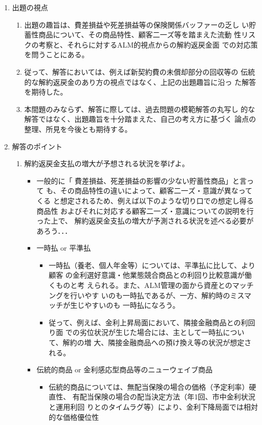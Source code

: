 \documentclass[report,gutter=10mm,fore-edge=10mm,uplatex,dvipdfmx]{jlreq}
\begin{document}
\begin{enumerate}
 \item 出題の視点
\begin{enumerate}
 \item 出題の趣旨は、費差損益や死差損益等の保険関係バッファーの乏し
い貯蓄性商品について、その商品特性、顧客二一ズ等を踏まえた流動
性リスクの考察と、それらに対するALM的視点からの解約返戻金面
での対応策を問うことにある。
 \item 従って、解答においては、例えば新契約費の未償却部分の回収等の
伝統的な解約返戻金のあり方の視点ではなく、上記の出題趣旨に沿っ
た解答を期待した。
 \item 本間題のみならず、解答に際しては、過去問題の模範解答の丸写し
的な解答ではなく、出題趣旨を十分踏まえた、自己の考え方に基づく
論点の整理、所見を今後とも期待する。
\end{enumerate}
 \item 解答のポイント
\begin{enumerate}
 \item 解約返戻金支払の増大が予想される状況を挙げよ。
\begin{itemize}
 \item 一般的に「 費差損益、死差損益の影響の少ない貯蓄性商品」と言って
も、その商品特性の違いによって、顧客二一ズ・意識が異なってくる
と想定されるため、例えば以下のような切り口での想定し得る商品性
およびそれに対応する顧客二一ズ・意識についての説明を行った上で、
解約返戻金支払の増大が予測される状況を述べる必要があろう．．．
 \item 一時払 or 平準払
\begin{itemize}
 \item 一時払（養老、個人年金等）については、平準払に比して、より顧客
の金利選好意識・他業態競合商品との利回り比較意識が働くものと考
えられる。また、ALM管理の面から資産とのマッチングを行いやす
いのも一時払であるが、一方、解約時のミスマッチが生じやすいのも
一時払になろう。
 \item 従って、例えば、金利上昇局面において、隣接金融商品との利回り面
での劣位状況が生じた場合には、主として一時払について、解約の増
大、隣接金融商品への預け換え等の状況が想定される。
\end{itemize}
 \item 伝統的商品 or 金利感応型商品等のニューウェイブ商品
\begin{itemize}
 \item 伝統的商品については、無配当保険の場合の価格（予定利率）硬直性、
有配当保険の場合の配当決定方法（年1回、市中金利状況と運用利回
りとのタイムラグ等）により、金利下降局面では相対的な価格優位性

\end{itemize}
\end{itemize}
\end{enumerate}
\end{enumerate}
\end{document}

